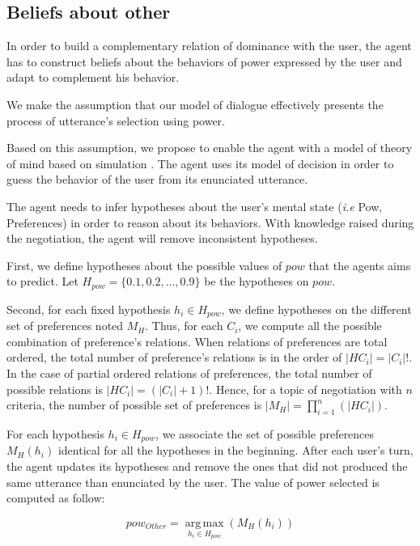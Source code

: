 \documentclass{llncs}
\begin{document}
	\subsection{Beliefs about other}
	
	In order to build a complementary relation of dominance with the user, the agent has to construct beliefs about the behaviors of power expressed by the user and adapt to complement his behavior. 
	
	We make the assumption that our model of dialogue effectively presents the process of utterance's selection using power. 
	
	Based on this assumption, we propose to enable the agent with a model of theory of mind based on simulation \cite{bibid}. The agent uses its model of decision in order to guess the behavior of the user from its enunciated utterance.   
	
	The agent needs to infer hypotheses about the user's mental state (\emph{i.e} Pow, Preferences) in order to reason about its behaviors. With knowledge raised during the negotiation, the agent will remove inconsistent hypotheses.
	
	First, we define hypotheses about the possible values of $pow$ that the agents aims to predict. Let $H_{pow} = \{0.1, 0.2, \ldots, 0.9\}$ be the hypotheses on $pow$.
	
	Second, for each fixed hypothesis $ h_i \in H_{pow}$, we define hypotheses on the different set of preferences  noted $M_H $. Thus, for each $C_i$, we compute all the possible combination of preference's relations. When relations of preferences are total ordered, the total number of preference's relations is in the order of $|H{C_i}| = |C_i|!$. In the case of partial ordered relations of preferences, the total number of possible relations is  $ |H{C_i}| = (|C_i| + 1)!$. Hence, for a topic of negotiation with $n$ criteria, the number of possible set of preferences is $ |M_H| = \prod_{i=1}^n (|H{C_i}|)$. 
	
	For each hypothesis $ h_i \in H_{pow}$, we associate the set of possible preferences $M_H(h_i)$ identical for all the hypotheses in the beginning. After each user's turn, the agent updates its hypotheses and remove the ones that did not produced the same utterance than enunciated by the user. The value of power selected is computed as follow:
	
	\begin{equation}
		pow_{Other} = \operatorname*{arg\,max}_{h_i \in H_{pow}} (M_H(h_i))
	\end{equation} 
	
\end{document}
